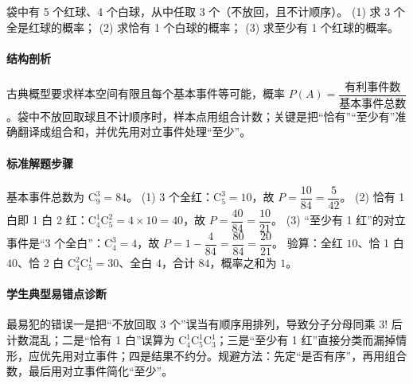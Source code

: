 \begin{problem}
袋中有 5 个红球、4 个白球，从中任取 3 个（不放回，且不计顺序）。
(1) 求 3 个全是红球的概率；
(2) 求恰有 1 个白球的概率；
(3) 求至少有 1 个红球的概率。
\end{problem}
\begin{solution}
\paragraph{结构剖析}
古典概型要求样本空间有限且每个基本事件等可能，概率 $P(A)=\dfrac{\text{有利事件数}}{\text{基本事件总数}}$。袋中不放回取球且不计顺序时，样本点用组合计数；关键是把“恰有”“至少有”准确翻译成组合和，并优先用对立事件处理“至少”。
\paragraph{标准解题步骤}
基本事件总数为 $\mathrm{C}_9^3=84$。
(1) 3 个全红：$\mathrm{C}_5^3=10$，故 $P=\dfrac{10}{84}=\dfrac{5}{42}$。
(2) 恰有 1 白即 1 白 2 红：$\mathrm{C}_4^1\mathrm{C}_5^2=4\times10=40$，故 $P=\dfrac{40}{84}=\dfrac{10}{21}$。
(3) “至少有 1 红”的对立事件是“3 个全白”：$\mathrm{C}_4^3=4$，故 $P=1-\dfrac{4}{84}=\dfrac{80}{84}=\dfrac{20}{21}$。
验算：全红 $10$、恰 1 白 $40$、恰 2 白 $\mathrm{C}_4^2\mathrm{C}_5^1=30$、全白 $4$，合计 $84$，概率之和为 $1$。
\paragraph{学生典型易错点诊断}
最易犯的错误一是把“不放回取 3 个”误当有顺序用排列，导致分子分母同乘 $3!$ 后计数混乱；二是“恰有 1 白”误算为 $\mathrm{C}_4^1\mathrm{C}_5^1\mathrm{C}_3^1$；三是“至少有 1 红”直接分类而漏掉情形，应优先用对立事件；四是结果不约分。规避方法：先定“是否有序”，再用组合数，最后用对立事件简化“至少”。
\end{solution}

